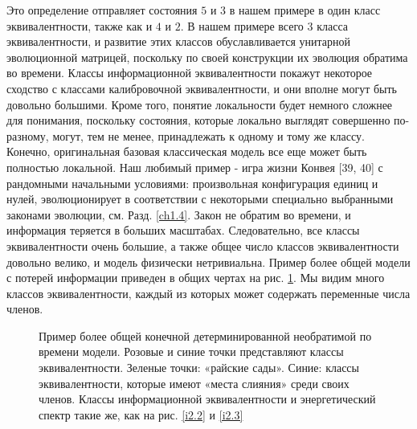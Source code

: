\documentclass[main.tex]{subfiles}
\begin{document}
Это определение отправляет состояния $ 5$ и $ 3$ в нашем примере в один класс эквивалентности, также как и $ 4$ и $ 2$. В нашем примере всего 3 класса эквивалентности, и развитие этих классов обуславливается унитарной эволюционной матрицей, поскольку по своей конструкции их эволюция обратима во времени. Классы информационной эквивалентности покажут некоторое сходство с классами калибровочной эквивалентности, и они вполне могут быть довольно большими. Кроме того, понятие локальности будет немного сложнее для понимания, поскольку состояния, которые локально выглядят совершенно по-разному, могут, тем не менее, принадлежать к одному и тому же классу. Конечно, оригинальная базовая классическая модель все еще может быть полностью локальной. Наш любимый пример - игра жизни Конвея [39, 40] с рандомными начальными условиями: произвольная конфигурация единиц и нулей, эволюционирует в соответствии с некоторыми специально выбранными законами эволюции, см. Разд. \ref{ch1.4}. Закон не обратим во времени, и информация теряется в больших масштабах. Следовательно, все классы эквивалентности очень большие, а также общее число классов эквивалентности довольно велико, и модель физически нетривиальна. Пример более общей модели с потерей информации приведен в общих чертах на рис. \ref{i7.2}. Мы видим много классов эквивалентности, каждый из которых может содержать переменные числа членов.

\begin{figure}[ht] %
\begin{center}
\caption{
\label{i7.2} Пример более общей конечной детерминированной необратимой по времени модели. Розовые и синие точки представляют классы эквивалентности. Зеленые точки: «райские сады». Синие: классы эквивалентности, которые имеют «места слияния» среди своих членов. Классы информационной эквивалентности и энергетический спектр такие же, как на рис. \ref{i2.2} и \ref{i2.3}}
\end {center}
\end {figure}
\end{document}
